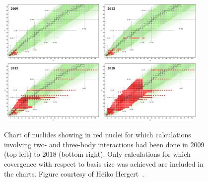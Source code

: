 \begin{figure}[t]
  \centering
  \includegraphics[width=0.45\textwidth]{proposal/doc/images/external/nuclear_chart_2009.pdf}
  \hspace{0cm}
  \includegraphics[width=0.45\textwidth]{proposal/doc/images/external/nuclear_chart_2012.pdf}\\
  \vspace{0.05cm}
  \includegraphics[width=0.45\textwidth]{proposal/doc/images/external/nuclear_chart_2015.pdf}
  \hspace{0cm}
  \includegraphics[width=0.45\textwidth]{proposal/doc/images/external/nuclear_chart_2018.pdf}
  \caption[
    Chart of nuclides showing in red nuclei for which \abinitio{} calculations
    involving two- and three-body interactions had been done in 2009 (top left)
    to 2018 (bottom right).
    Only calculations for which covergence with respect to basis size was achieved
    are included in the charts.
  ]{
    Chart of nuclides showing in red nuclei for which \abinitio{} calculations
    involving two- and three-body interactions had been done in 2009 (top left)
    to 2018 (bottom right).
    Only calculations for which covergence with respect to basis size was achieved
    are included in the charts.
    Figure courtesy of Heiko Hergert~\cite{Herg15imsrgphysrep}.
  }\label{fig:ab_initio_conquest}
\end{figure}

